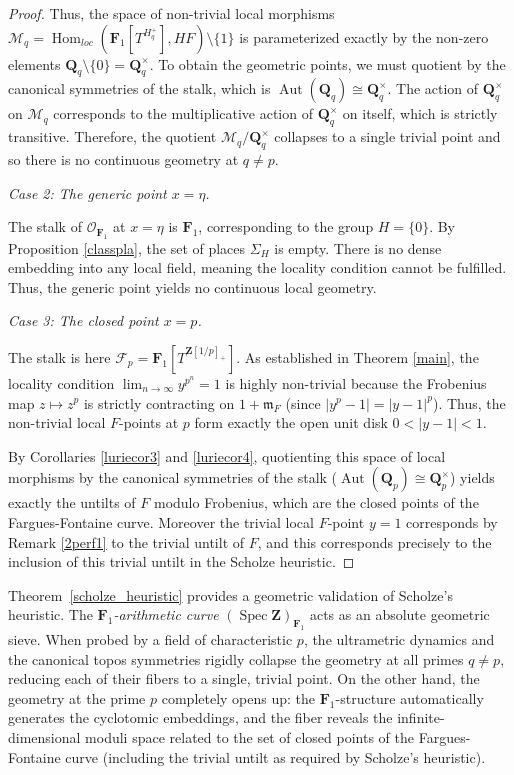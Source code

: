 \documentclass[11pt,a4paper]{article}
\newcommand{\Q}{\mathbf{Q}}
\newcommand{\Z}{\mathbf{Z}}
\newcommand{\Fone}{\mathbf{F}_{1}}
\def\spzf{(\Spec \Z)_{\mathbf{F}_{1}}}
\newcommand{\Spec}{\operatorname{Spec}}
\begin{document}
\begin{proof}
Thus, the space of non-trivial local morphisms $\mathcal{M}_q=\operatorname{Hom}_{loc}(\Fone[T^{H_q^+}], HF)\setminus\{1\}$ is parameterized exactly by the non-zero elements $\Q_q \setminus \{0\} = \Q_q^\times$. To obtain the geometric points, we must quotient by the canonical symmetries of the stalk, which is $\operatorname{Aut}(\Q_q) \cong \Q_q^\times$. The action of $\Q_q^\times$ on $\mathcal{M}_q$ corresponds to the multiplicative action of $\Q_q^\times$ on itself, which is strictly transitive. Therefore, the quotient $\mathcal{M}_q / \Q_q^\times$ collapses to a single trivial point and so there is no continuous geometry at $q \neq p$.\vspace{.03in}

\emph{Case 2: The generic point $x = \eta$.} 

The stalk of $\mathcal O_{\Fone}$ at $x=\eta$ is $\Fone$, corresponding to the group $H = \{0\}$. By Proposition \ref{classpla}, the set of places $\Sigma_H$ is empty. There is no dense embedding into any local field, meaning the locality condition cannot be fulfilled. Thus, the generic point yields no continuous local geometry.\vspace{.03in}

\emph{Case 3: The closed point $x = p$.} 

The stalk is here $\mathcal{F}_p = \Fone[T^{\Z[1/p]_+}]$. As established in Theorem \ref{main}, the locality condition $\lim_{n \to \infty} y^{p^n} = 1$ is highly non-trivial because the Frobenius map $z \mapsto z^p$ is strictly contracting on $1 + \mathfrak{m}_F$ (since $|y^p - 1| = |y - 1|^p$). 
Thus, the non-trivial local $F$-points at $p$ form exactly the open unit disk $0 < |y - 1| < 1$. 

By Corollaries \ref{luriecor3} and \ref{luriecor4}, quotienting this space of local morphisms by the canonical  symmetries of the stalk ($\operatorname{Aut}(\Q_p) \cong \Q_p^\times$) yields exactly the untilts of $F$ modulo Frobenius, which are the closed points of the Fargues-Fontaine curve. Moreover the trivial local $F$-point $y=1$ corresponds by Remark \ref{2perf1} to the trivial untilt of $F$, and this corresponds precisely to the inclusion of this trivial untilt in the Scholze heuristic.
\end{proof}

Theorem~\ref{scholze_heuristic} provides a  geometric validation of Scholze's heuristic. The \emph{$\Fone$-arithmetic curve} $\spzf$
acts as an absolute geometric sieve. When probed by a field of characteristic $p$, the ultrametric dynamics and the canonical topos symmetries rigidly collapse the geometry at all primes $q \neq p$, reducing each of their fibers to a single, trivial point. On the other hand, the geometry at the prime $p$ completely opens up: the $\Fone$-structure automatically generates the cyclotomic embeddings, and the fiber reveals the infinite-dimensional moduli space related to the set of closed points of the Fargues-Fontaine curve (including the trivial untilt as required by Scholze's heuristic).
\end{document}
